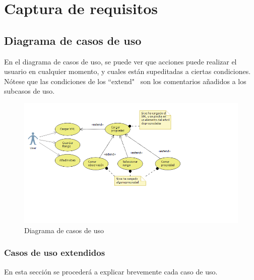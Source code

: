 \chapter{Captura de requisitos}
%

\section{Diagrama de casos de uso}
En el diagrama de casos de uso, se puede ver que acciones puede realizar el usuario en cualquier momento, y cuales
est\'an supeditadas a ciertas condiciones. N\'otese que las condiciones de los ``extend" \ son los comentarios a\~nadidos
a los subcasos de uso.

\begin{figure}[h]
\centering
\includegraphics[width=1.0\linewidth]{./Figures/useCaseDiagram.png}
\caption[Diagrama de casos de uso]{Diagrama de casos de uso}
\label{fig:useCaseDiagram}
\end{figure}

\subsection{Casos de uso extendidos}
En esta secci\'on se proceder\'a a explicar brevemente cada caso de uso. %

